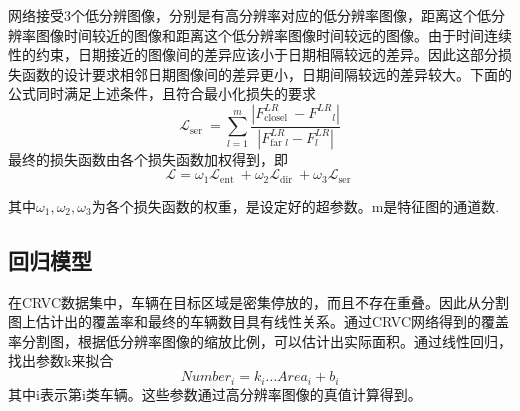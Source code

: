 网络接受3个低分辨图像，分别是有高分辨率对应的低分辨率图像，距离这个低分辨率图像时间较近的图像和距离这个低分辨率图像时间较远的图像。由于时间连续性的约束，日期接近的图像间的差异应该小于日期相隔较远的差异。因此这部分损失函数的设计要求相邻日期图像间的差异更小，日期间隔较远的差异较大。下面的公式同时满足上述条件，且符合最小化损失的要求
\begin{equation}
    \mathcal{L}_{\text {ser }}=\sum_{l=1}^{m} \frac{\left|F_{\text {closel }}^{L R}-F^{L R}{ }_{l}\right|}{\left|F_{\text {far } l}^{L R}-F^{L R}_ l\right|}
\end{equation}
最终的损失函数由各个损失函数加权得到，即
\begin{equation}
    \mathcal{L}=\omega_1\mathcal{L}_{\text {ent }}+\omega_2\mathcal{L}_{\text {dir }}+\omega_3\mathcal{L}_{\text {ser }}
\end{equation}

其中$\omega_1,\omega_2,\omega_3$为各个损失函数的权重，是设定好的超参数。m是特征图的通道数.

\subsection{回归模型}

在CRVC数据集中，车辆在目标区域是密集停放的，而且不存在重叠。因此从分割图上估计出的覆盖率和最终的车辆数目具有线性关系。通过CRVC网络得到的覆盖率分割图，根据低分辨率图像的缩放比例，可以估计出实际面积。通过线性回归，找出参数k来拟合
\begin{equation}
    Number_i=k_i\dots Area_i+b_i
\end{equation}
其中i表示第i类车辆。这些参数通过高分辨率图像的真值计算得到。
